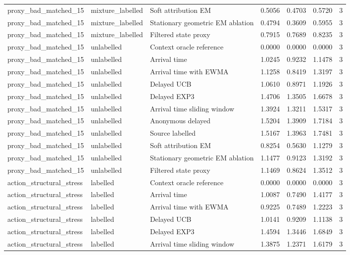 \begin{tabular}{llllllr}
proxy\_bad\_matched\_15 & mixture\_labelled & Soft attribution EM & 0.5056 & 0.4703 & 0.5720 & 3 \\
proxy\_bad\_matched\_15 & mixture\_labelled & Stationary geometric EM ablation & 0.4794 & 0.3609 & 0.5955 & 3 \\
proxy\_bad\_matched\_15 & mixture\_labelled & Filtered state proxy & 0.7915 & 0.7689 & 0.8235 & 3 \\
proxy\_bad\_matched\_15 & unlabelled & Context oracle reference & 0.0000 & 0.0000 & 0.0000 & 3 \\
proxy\_bad\_matched\_15 & unlabelled & Arrival time & 1.0245 & 0.9232 & 1.1478 & 3 \\
proxy\_bad\_matched\_15 & unlabelled & Arrival time with EWMA & 1.1258 & 0.8419 & 1.3197 & 3 \\
proxy\_bad\_matched\_15 & unlabelled & Delayed UCB & 1.0610 & 0.8971 & 1.1926 & 3 \\
proxy\_bad\_matched\_15 & unlabelled & Delayed EXP3 & 1.4706 & 1.3505 & 1.6678 & 3 \\
proxy\_bad\_matched\_15 & unlabelled & Arrival time sliding window & 1.3924 & 1.3211 & 1.5317 & 3 \\
proxy\_bad\_matched\_15 & unlabelled & Anonymous delayed & 1.5204 & 1.3909 & 1.7184 & 3 \\
proxy\_bad\_matched\_15 & unlabelled & Source labelled & 1.5167 & 1.3963 & 1.7481 & 3 \\
proxy\_bad\_matched\_15 & unlabelled & Soft attribution EM & 0.8254 & 0.5630 & 1.1279 & 3 \\
proxy\_bad\_matched\_15 & unlabelled & Stationary geometric EM ablation & 1.1477 & 0.9123 & 1.3192 & 3 \\
proxy\_bad\_matched\_15 & unlabelled & Filtered state proxy & 1.1469 & 0.8624 & 1.3512 & 3 \\
action\_structural\_stress & labelled & Context oracle reference & 0.0000 & 0.0000 & 0.0000 & 3 \\
action\_structural\_stress & labelled & Arrival time & 1.0087 & 0.7490 & 1.4177 & 3 \\
action\_structural\_stress & labelled & Arrival time with EWMA & 0.9225 & 0.7489 & 1.2223 & 3 \\
action\_structural\_stress & labelled & Delayed UCB & 1.0141 & 0.9209 & 1.1138 & 3 \\
action\_structural\_stress & labelled & Delayed EXP3 & 1.4594 & 1.3446 & 1.6849 & 3 \\
action\_structural\_stress & labelled & Arrival time sliding window & 1.3875 & 1.2371 & 1.6179 & 3 \\

\end{tabular}
